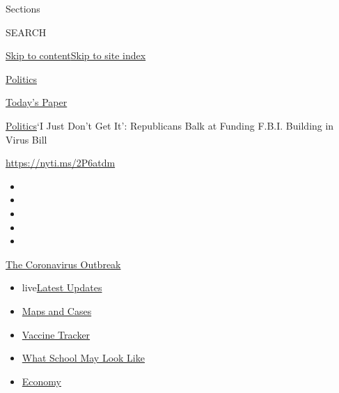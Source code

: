 Sections

SEARCH

\protect\hyperlink{site-content}{Skip to
content}\protect\hyperlink{site-index}{Skip to site index}

\href{https://www.nytimes.com/section/politics}{Politics}

\href{https://myaccount.nytimes.com/auth/login?response_type=cookie\&client_id=vi}{}

\href{https://www.nytimes.com/section/todayspaper}{Today's Paper}

\href{/section/politics}{Politics}\textbar{}`I Just Don't Get It':
Republicans Balk at Funding F.B.I. Building in Virus Bill

\url{https://nyti.ms/2P6atdm}

\begin{itemize}
\item
\item
\item
\item
\item
\end{itemize}

\href{https://www.nytimes.com/news-event/coronavirus?action=click\&pgtype=Article\&state=default\&region=TOP_BANNER\&context=storylines_menu}{The
Coronavirus Outbreak}

\begin{itemize}
\tightlist
\item
  live\href{https://www.nytimes.com/2020/08/01/world/coronavirus-covid-19.html?action=click\&pgtype=Article\&state=default\&region=TOP_BANNER\&context=storylines_menu}{Latest
  Updates}
\item
  \href{https://www.nytimes.com/interactive/2020/us/coronavirus-us-cases.html?action=click\&pgtype=Article\&state=default\&region=TOP_BANNER\&context=storylines_menu}{Maps
  and Cases}
\item
  \href{https://www.nytimes.com/interactive/2020/science/coronavirus-vaccine-tracker.html?action=click\&pgtype=Article\&state=default\&region=TOP_BANNER\&context=storylines_menu}{Vaccine
  Tracker}
\item
  \href{https://www.nytimes.com/interactive/2020/07/29/us/schools-reopening-coronavirus.html?action=click\&pgtype=Article\&state=default\&region=TOP_BANNER\&context=storylines_menu}{What
  School May Look Like}
\item
  \href{https://www.nytimes.com/live/2020/07/31/business/stock-market-today-coronavirus?action=click\&pgtype=Article\&state=default\&region=TOP_BANNER\&context=storylines_menu}{Economy}
\end{itemize}

